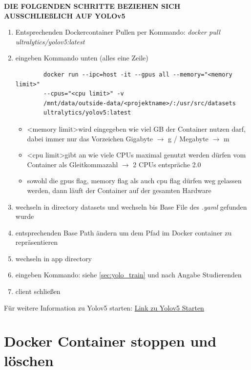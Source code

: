\textbf{DIE FOLGENDEN SCHRITTE BEZIEHEN SICH AUSSCHLIEßLICH AUF YOLOv5}
\begin{enumerate}
    \item Entsprechenden Dockercontainer Pullen per Kommando: \textit{docker pull ultralytics/yolov5:latest} 
    \item eingeben Kommando unten (alles eine Zeile)
    \begin{verbatim}
        docker run --ipc=host -it --gpus all --memory="<memory limit>"
        --cpus="<cpu limit>" -v 
        /mnt/data/outside-data/<projektname>/:/usr/src/datasets
        ultralytics/yolov5:latest
    \end{verbatim}
    \begin{itemize}
        \item \textless memory limit\textgreater  wird eingegeben wie viel GB der Container nutzen darf, dabei immer nur das Vorzeichen Gigabyte  $\rightarrow$ g / Megabyte $\rightarrow$ m
        \item \textless cpu limit\textgreater gibt an wie viele CPUs maximal genutzt werden dürfen vom Container als Gleitkommazahl $\rightarrow$ 2 CPUs entspräche 2.0
        \item sowohl die gpus flag, memory flag als auch cpu flag dürfen weg gelassen werden, dann läuft der Container auf der gesamten Hardware    
    \end{itemize}
    \item wechseln in directory datasets und wechseln bis Base File des \textit{.yaml} gefunden wurde
    \item entsprechenden Base Path ändern um dem Pfad im Docker container zu repräsentieren
    \item wechseln in app directory
    \item eingeben Kommando: siehe \autoref{sec:yolo_train} und nach Angabe Studierenden
    \item client schließen

\end{enumerate}
Für weitere Information zu Yolov5 starten: \href{https://github.com/ultralytics/yolov5/wiki/Docker-Quickstart}{Link zu Yolov5 Starten} 

\section{Docker Container stoppen und löschen}
